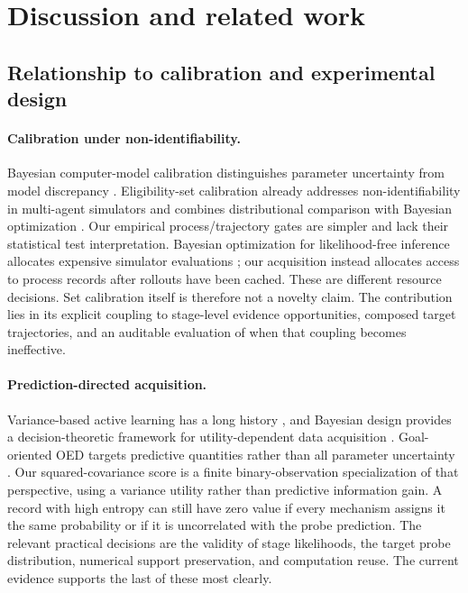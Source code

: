 \section{Discussion and related work}
\subsection{Relationship to calibration and experimental design}
\paragraph{Calibration under non-identifiability.}
Bayesian computer-model calibration distinguishes parameter uncertainty from model discrepancy \citep{kennedy2001}. Eligibility-set calibration already addresses non-identifiability in multi-agent simulators and combines distributional comparison with Bayesian optimization \citep{bai2022}. Our empirical process/trajectory gates are simpler and lack their statistical test interpretation. Bayesian optimization for likelihood-free inference allocates expensive simulator evaluations \citep{gutmann2016}; our acquisition instead allocates access to process records after rollouts have been cached. These are different resource decisions. Set calibration itself is therefore not a novelty claim. The contribution lies in its explicit coupling to stage-level evidence opportunities, composed target trajectories, and an auditable evaluation of when that coupling becomes ineffective.

\paragraph{Prediction-directed acquisition.}
Variance-based active learning has a long history \citep{cohn1996}, and Bayesian design provides a decision-theoretic framework for utility-dependent data acquisition \citep{chaloner1995}. Goal-oriented OED targets predictive quantities rather than all parameter uncertainty \citep{attia2018,zhong2026}. Our squared-covariance score is a finite binary-observation specialization of that perspective, using a variance utility rather than predictive information gain. A record with high entropy can still have zero value if every mechanism assigns it the same probability or if it is uncorrelated with the probe prediction. The relevant practical decisions are the validity of stage likelihoods, the target probe distribution, numerical support preservation, and computation reuse. The current evidence supports the last of these most clearly.

